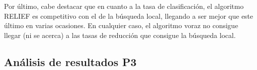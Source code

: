 \documentclass[12pt]{article}
\begin{document}
Por último, cabe destacar que en cuanto a la tasa de clasificación, el algoritmo RELIEF es competitivo con el de la búsqueda local, llegando a ser mejor que este último en varias ocasiones. En cualquier caso, el algoritmo voraz no consigue llegar (ni se acerca) a las tasas de reducción que consigue la búsqueda local.

\subsection*{Análisis de resultados P3}
\label{analisis}
\end{document}
